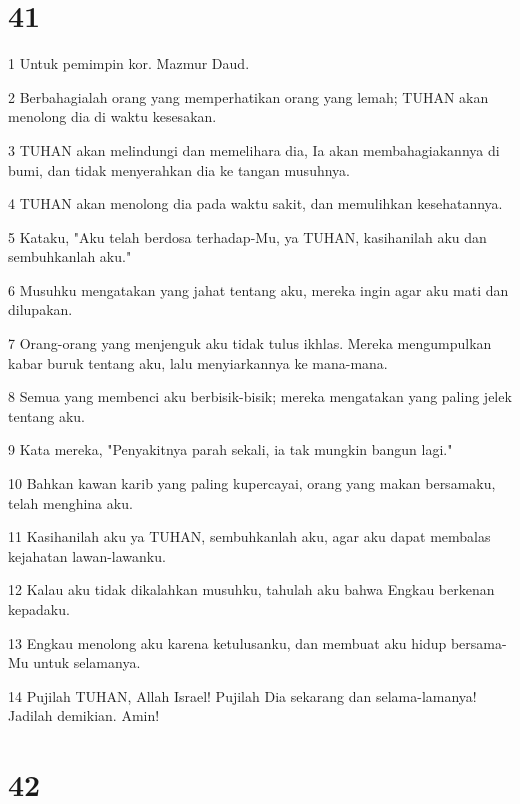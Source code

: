 \chapter{41}

\par 1 Untuk pemimpin kor. Mazmur Daud.
\par 2 Berbahagialah orang yang memperhatikan orang yang lemah; TUHAN akan menolong dia di waktu kesesakan.
\par 3 TUHAN akan melindungi dan memelihara dia, Ia akan membahagiakannya di bumi, dan tidak menyerahkan dia ke tangan musuhnya.
\par 4 TUHAN akan menolong dia pada waktu sakit, dan memulihkan kesehatannya.
\par 5 Kataku, "Aku telah berdosa terhadap-Mu, ya TUHAN, kasihanilah aku dan sembuhkanlah aku."
\par 6 Musuhku mengatakan yang jahat tentang aku, mereka ingin agar aku mati dan dilupakan.
\par 7 Orang-orang yang menjenguk aku tidak tulus ikhlas. Mereka mengumpulkan kabar buruk tentang aku, lalu menyiarkannya ke mana-mana.
\par 8 Semua yang membenci aku berbisik-bisik; mereka mengatakan yang paling jelek tentang aku.
\par 9 Kata mereka, "Penyakitnya parah sekali, ia tak mungkin bangun lagi."
\par 10 Bahkan kawan karib yang paling kupercayai, orang yang makan bersamaku, telah menghina aku.
\par 11 Kasihanilah aku ya TUHAN, sembuhkanlah aku, agar aku dapat membalas kejahatan lawan-lawanku.
\par 12 Kalau aku tidak dikalahkan musuhku, tahulah aku bahwa Engkau berkenan kepadaku.
\par 13 Engkau menolong aku karena ketulusanku, dan membuat aku hidup bersama-Mu untuk selamanya.
\par 14 Pujilah TUHAN, Allah Israel! Pujilah Dia sekarang dan selama-lamanya! Jadilah demikian. Amin!

\chapter{42}

